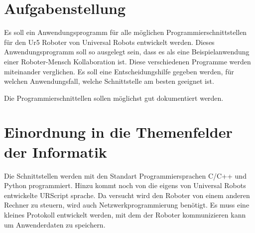 \section{Aufgabenstellung}
\label{aufgabenstellung}

Es soll ein Anwendungsprogramm für alle möglichen Programmierschnittstellen für den Ur5 Roboter von Universal Robots entwickelt werden.
Dieses Anwendungsprogramm soll so ausgelegt sein, dass es als eine Beispielanwendung einer Roboter-Mensch Kollaboration ist.
Diese verschiedenen Programme werden miteinander verglichen. Es soll eine Entscheidungshilfe gegeben werden, für welchen Anwendungsfall, welche Schnittstelle am besten geeignet ist.

Die Programmierschnittellen sollen möglichst gut dokumentiert werden.

\section{Einordnung in die Themenfelder der Informatik}
\label{sec:einordnung}

Die Schnittstellen werden mit den Standart Programmiersprachen C/C++ und Python programmiert. Hinzu kommt noch von die eigens von Universal Robots entwickelte URScript sprache.
Da versucht wird den Roboter von einem anderen Rechner zu steuern, wird auch Netzwerkprogrammierung benötigt. Es muss eine kleines Protokoll entwickelt werden, mit dem der Roboter kommunizieren kann um Anwenderdaten zu speichern. 
